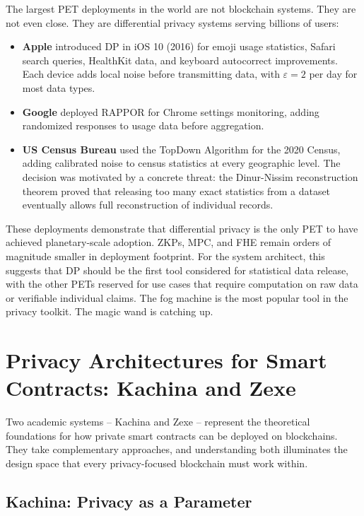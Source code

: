 \documentclass[
  11pt,
  openany]{report}
\providecommand{\tightlist}{%
  \setlength{\itemsep}{0pt}\setlength{\parskip}{0pt}}
\renewcommand{\textbf}[1]{{\bfseries\color{MidnightBold}#1}}
\begin{document}
The largest PET deployments in the world are not blockchain systems. They are
not even close. They are differential privacy systems serving billions of users:

\begin{itemize}
\tightlist
\item
  \textbf{Apple} introduced DP in iOS 10 (2016) for emoji usage statistics,
  Safari search queries, HealthKit data, and keyboard autocorrect improvements.
  Each device adds local noise before transmitting data, with
  \(\varepsilon = 2\) per day for most data types.
\item
  \textbf{Google} deployed RAPPOR for Chrome settings monitoring, adding
  randomized responses to usage data before aggregation.
\item
  \textbf{US Census Bureau} used the TopDown Algorithm for the 2020 Census,
  adding calibrated noise to census statistics at every geographic level. The
  decision was motivated by a concrete threat: the Dinur-Nissim reconstruction
  theorem proved that releasing too many exact statistics from a dataset
  eventually allows full reconstruction of individual records.
\end{itemize}

These deployments demonstrate that differential privacy is the only PET to have
achieved planetary-scale adoption. ZKPs, MPC, and FHE remain orders of magnitude
smaller in deployment footprint. For the system architect, this suggests that DP
should be the first tool considered for statistical data release, with the other
PETs reserved for use cases that require computation on raw data or verifiable
individual claims. The fog machine is the most popular tool in the privacy
toolkit. The magic wand is catching up.

\section{Privacy Architectures for Smart Contracts: Kachina and
Zexe}\label{privacy-architectures-for-smart-contracts-kachina-and-zexe}

Two academic systems -- Kachina and Zexe -- represent the theoretical
foundations for how private smart contracts can be deployed on blockchains. They
take complementary approaches, and understanding both illuminates the design
space that every privacy-focused blockchain must work within.

\subsection{Kachina: Privacy as a
Parameter}\label{kachina-privacy-as-a-parameter}
\end{document}
